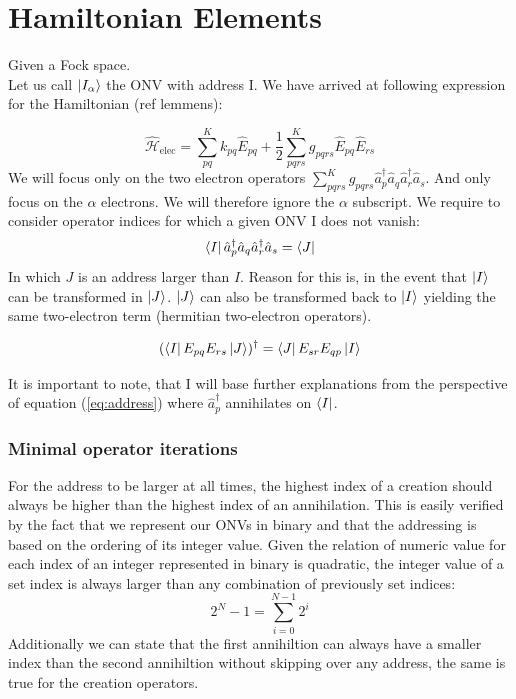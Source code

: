 
\section{Hamiltonian Elements}

Given a Fock space.
\\
Let us call $\ket{I_{\alpha}}$ the ONV with address I.
We have arrived at following expression for the Hamiltonian (ref lemmens):

      \begin{equation}\label{eq:ham}
          \hat{\mathcal{H}}_\text{elec} = \sum_{pq}^K k_{pq} \hat{E}_{pq} + \frac{1}{2} \sum_{pqrs}^K g_{pqrs} \hat{E}_{pq} \hat{E}_{rs}
      \end{equation}
We will focus only on the two electron operators $ \sum_{pqrs}^K g_{pqrs} \hat{a}^{\dagger}_{p} \hat{a}_{q}  \hat{a}^{\dagger}_{r} \hat{a}_{s}$. And only focus on the $\alpha$ electrons. We will therefore ignore the $\alpha$ subscript.
We require to consider operator indices for which a given ONV I does not vanish:
\begin{equation} \label{eq:address}
  \bra{I} \hat{a}^{\dagger}_{p} \hat{a}_{q} \hat{a}^{\dagger}_{r} \hat{a}_{s} = \bra{J}
\end{equation}
In which $J$ is an address larger than $I$. Reason for this is, in the event that $\ket{I}$ can be transformed in $\ket{J}$. $\ket{J}$ can also be transformed back to $\ket{I}$ yielding the same two-electron term (hermitian two-electron operators).

\begin{equation}
  (\bra{I} E_{pq} E_{rs} \ket{J})^\dagger = \bra{J} E_{sr} E_{qp} \ket{I}
\end{equation}

It is important to note, that I will base further explanations from the perspective of equation (\ref{eq:address}) where $\hat{a}^{\dagger}_{p}$ annihilates on $\bra{I}$.

\subsubsection{Minimal operator iterations}
For the address to be larger at all times, the highest index of a creation should always be higher than the highest index of an annihilation. This is easily verified by the fact that we represent our ONVs in binary and that the addressing is based on the ordering of its integer value. Given the relation of numeric value for each index of an integer represented in binary is quadratic, the integer value of a set index is always larger than any combination of previously set indices:
\begin{equation}
  2^N - 1 = \sum^{N-1}_{i=0} 2^i
\end{equation}
Additionally we can state that the first annihiltion can always have a smaller index than the second annihiltion without skipping over any address, the same is true for the creation operators.

